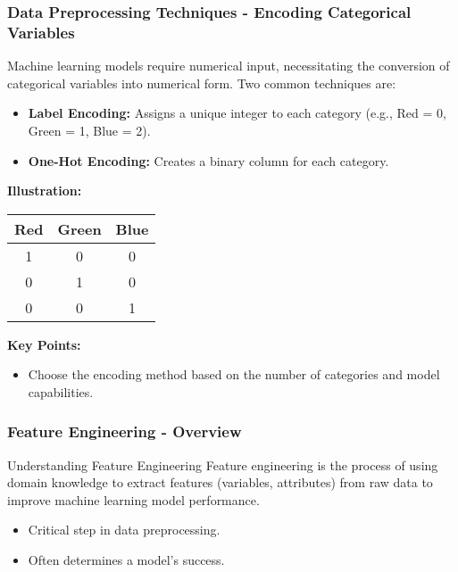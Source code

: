 \documentclass[aspectratio=169]{beamer}
\begin{document}
\begin{frame}[fragile]
    \frametitle{Data Preprocessing Techniques - Encoding Categorical Variables}
    Machine learning models require numerical input, necessitating the conversion of categorical variables into numerical form. Two common techniques are:
    
    \begin{itemize}
        \item \textbf{Label Encoding:} Assigns a unique integer to each category (e.g., Red = 0, Green = 1, Blue = 2).
        \item \textbf{One-Hot Encoding:} Creates a binary column for each category.
    \end{itemize}

    \textbf{Illustration:}
    \begin{center}
        \begin{tabular}{|c|c|c|}
            \hline
            Red & Green & Blue \\
            \hline
            1   & 0     & 0    \\
            0   & 1     & 0    \\
            0   & 0     & 1    \\
            \hline
        \end{tabular}
    \end{center}

    \textbf{Key Points:}
    \begin{itemize}
        \item Choose the encoding method based on the number of categories and model capabilities.
    \end{itemize}
\end{frame}

\begin{frame}[fragile]
    \frametitle{Feature Engineering - Overview}
    \begin{block}{Understanding Feature Engineering}
        Feature engineering is the process of using domain knowledge to extract features (variables, attributes) from raw data to improve machine learning model performance. 
    \end{block}
    \begin{itemize}
        \item Critical step in data preprocessing.
        \item Often determines a model's success.
    \end{itemize}
\end{frame}
\end{document}
